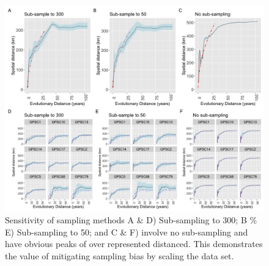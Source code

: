 \documentclass{article}
\begin{document}
\begin{figure}[H]
\centering
    \includegraphics[width=\textwidth]{sensitivity_sampling.jpeg}
    \caption{Sensitivity of sampling methods A \& D) Sub-sampling to 300; B \% E) Sub-sampling to 50; and C \& F) involve no sub-sampling and have obvious peaks of over represented distanced. This demonstrates the value of mitigating sampling bias by scaling the data set.}
      \label{fig:sensanalysis}
\end{figure}
\end{document}
